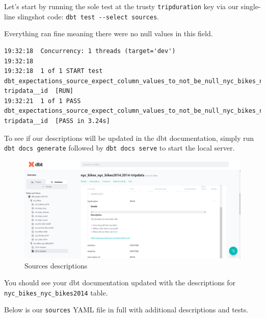 \documentclass[
]{book}
\begin{document}
Let's start by running the sole test at the trusty \texttt{tripduration} key via our single-line slingshot code: \texttt{dbt\ test\ -\/-select\ sources}.

Everything ran fine meaning there were no null values in this field.

\begin{verbatim}
19:32:18  Concurrency: 1 threads (target='dev')
19:32:18  
19:32:18  1 of 1 START test dbt_expectations_source_expect_column_values_to_not_be_null_nyc_bikes_nyc_bikes2014_2014-tripdata__id  [RUN]
19:32:21  1 of 1 PASS dbt_expectations_source_expect_column_values_to_not_be_null_nyc_bikes_nyc_bikes2014_2014-tripdata__id  [PASS in 3.24s]
\end{verbatim}

To see if our descriptions will be updated in the dbt documentation, simply run \texttt{dbt\ docs\ generate} followed by \texttt{dbt\ docs\ serve} to start the local server.

\begin{figure}
\centering
\includegraphics{./images/sources_definitions.png}
\caption{Sources descriptions}
\end{figure}

You should see your dbt documentation updated with the descriptions for \texttt{nyc\_bikes\_nyc\_bikes2014} table.

Below is our \texttt{sources} YAML file in full with additional descriptions and tests.
\end{document}
